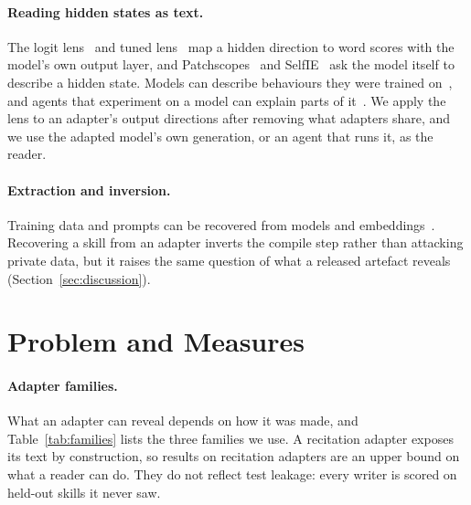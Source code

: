\documentclass[11pt]{article}
\begin{document}
\paragraph{Reading hidden states as text.} The logit lens~\cite{logitlens} and tuned lens~\cite{tunedlens} map a hidden direction to word
scores with the model's own output layer, and Patchscopes~\cite{patchscopes} and SelfIE~\cite{selfie} ask the model itself to describe a
hidden state. Models can describe behaviours they were trained on~\cite{betley}, and agents that experiment on a model can explain parts of
it~\cite{maia}. We apply the lens to an adapter's output directions after removing what adapters share, and we use the adapted model's own
generation, or an agent that runs it, as the reader.

\paragraph{Extraction and inversion.} Training data and prompts can be recovered from models and embeddings~\cite{carlini,nasr,vec2text,lminversion}.
Recovering a skill from an adapter inverts the compile step rather than attacking private data, but it raises the same question of what a
released artefact reveals (Section~\ref{sec:discussion}).

\section{Problem and Measures}
\label{sec:problem}

\paragraph{Adapter families.} What an adapter can reveal depends on how it was made, and Table~\ref{tab:families} lists the three families
we use. A recitation adapter exposes its text by construction, so results on recitation adapters are an upper bound on what a reader can do.
They do not reflect test leakage: every writer is scored on held-out skills it never saw.
\end{document}
